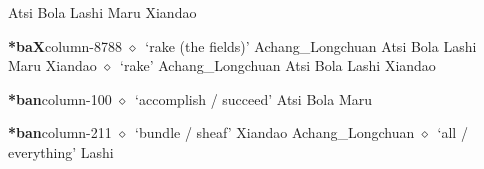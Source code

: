 \hspace{1ex}
         Atsi 
\hspace{1ex}
         Bola 
\hspace{1ex}
         Lashi 
\hspace{1ex}
         Maru 
\hspace{1ex}
         Xiandao 
  \item {\footnotesize \textbf{*baX}}{\tiny column-8788}
         $\diamond$~`rake (the fields)'
         Achang\_Longchuan 
\hspace{1ex}
         Atsi 
\hspace{1ex}
         Bola 
\hspace{1ex}
         Lashi 
\hspace{1ex}
         Maru 
\hspace{1ex}
         Xiandao 
\hspace{1ex}
         $\diamond$~`rake'
         Achang\_Longchuan 
\hspace{1ex}
         Atsi 
\hspace{1ex}
         Bola 
\hspace{1ex}
         Lashi 
\hspace{1ex}
         Xiandao 
  \item {\footnotesize \textbf{*ban}}{\tiny column-100}
         $\diamond$~`accomplish / succeed'
         Atsi 
\hspace{1ex}
         Bola 
\hspace{1ex}
         Maru 
  \item {\footnotesize \textbf{*ban}}{\tiny column-211}
         $\diamond$~`bundle / sheaf'
         Xiandao 
\hspace{1ex}
         Achang\_Longchuan 
\hspace{1ex}
         $\diamond$~`all / everything'
         Lashi 
